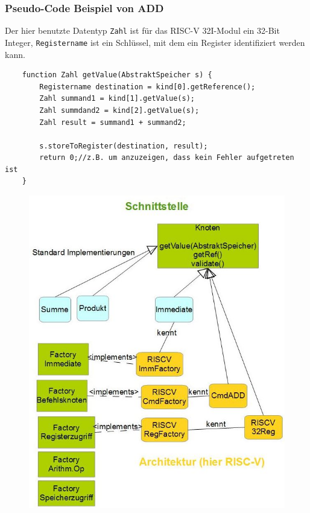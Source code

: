 \subsubsection{Pseudo-Code Beispiel von ADD}
Der hier benutzte Datentyp \texttt{Zahl} ist für das RISC-V 32I-Modul ein 32-Bit Integer, \texttt{Registername} ist ein Schlüssel, mit dem ein Register identifiziert werden kann.
\begin{lstlisting}
	function Zahl getValue(AbstraktSpeicher s) {
		Registername destination = kind[0].getReference();
		Zahl summand1 = kind[1].getValue(s);
		Zahl summdand2 = kind[2].getValue(s);
		Zahl result = summand1 + summand2;

		s.storeToRegister(destination, result);
		return 0;//z.B. um anzuzeigen, dass kein Fehler aufgetreten ist
	}
\end{lstlisting}
\begin{figure}[h!]
\includegraphics[scale=0.5]{../arch/figures/zeichnung}
\end{figure}

